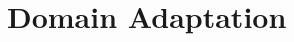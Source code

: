 \documentclass[a4paper,12pt]{article}
\begin{document}








\section{Domain Adaptation}
\end{document}
